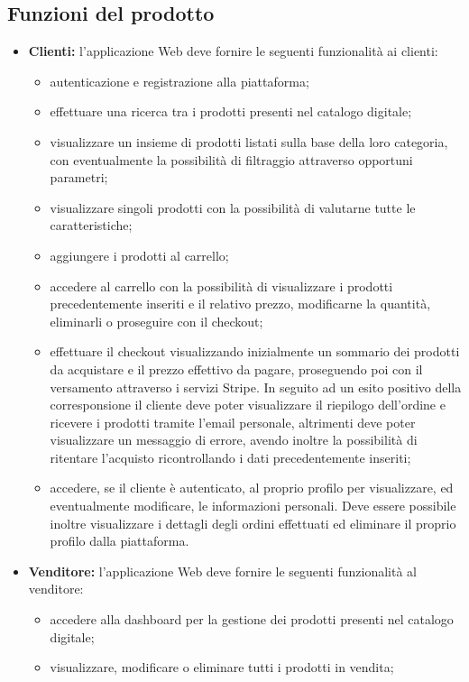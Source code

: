 \subsection{Funzioni del prodotto}
\begin{itemize}
\item \textbf{Clienti:} l'applicazione Web deve fornire le seguenti funzionalità ai clienti:
	\begin{itemize}
	\item autenticazione e registrazione alla piattaforma;
	\item effettuare una ricerca tra i prodotti presenti nel catalogo digitale;
	\item visualizzare un insieme di prodotti listati sulla base della loro categoria, con eventualmente la possibilità di filtraggio attraverso opportuni parametri;
	\item visualizzare singoli prodotti con la possibilità di valutarne tutte le caratteristiche;
	\item aggiungere i prodotti al carrello;
	\item accedere al carrello con la possibilità di visualizzare i prodotti precedentemente inseriti e il relativo prezzo, modificarne la quantità, eliminarli o proseguire con il checkout;
	\item effettuare il checkout visualizzando inizialmente un sommario dei prodotti da acquistare e il prezzo effettivo da pagare, proseguendo poi con il versamento attraverso i servizi Stripe. In seguito ad un esito positivo della corresponsione il cliente deve poter visualizzare il riepilogo dell'ordine e ricevere i prodotti tramite l'email personale, altrimenti deve poter visualizzare un messaggio di errore, avendo inoltre la possibilità di ritentare l'acquisto ricontrollando i dati precedentemente inseriti;
	\item accedere, se il cliente è autenticato, al proprio profilo per visualizzare, ed eventualmente modificare, le informazioni personali. Deve essere possibile inoltre visualizzare i dettagli degli ordini effettuati ed eliminare il proprio profilo dalla piattaforma.
	\end{itemize}
\item \textbf{Venditore:} l'applicazione Web deve fornire le seguenti funzionalità al venditore:
	\begin{itemize}
	\item accedere alla dashboard per la gestione dei prodotti presenti nel catalogo digitale;
	\item visualizzare, modificare o eliminare tutti i prodotti in vendita;

\end{itemize}
\end{itemize}
